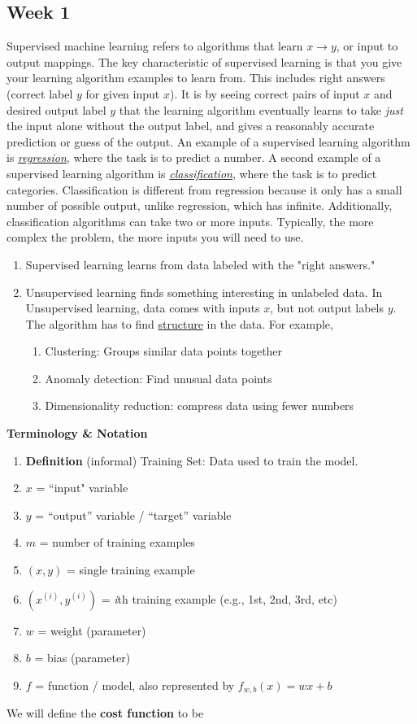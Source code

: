 \documentclass[11 pt]{scrartcl}
\begin{document}
\subsection{Week 1}
Supervised machine learning refers to algorithms that learn $x \rightarrow y$, or input to output mappings.
\newline\newline The key characteristic of supervised learning is that you give your learning algorithm examples to learn from. This includes
right answers (correct label $y$ for given input $x$). It is by seeing correct pairs of input $x$ and desired output label $y$
that the learning algorithm eventually learns to take \textit{just} the input alone without the output label, and gives a reasonably
accurate prediction or guess of the output. An example of a supervised learning algorithm is \textit{\underline{regression}}, where the task is to predict
a number. A second example of a supervised learning algorithm is \textit{\underline{classification}}, where the task is to predict
categories. Classification is different from regression because it only has a small number of possible output, unlike regression, which has infinite.
Additionally, classification algorithms can take two or more inputs. Typically, the more complex the problem, the more
inputs you will need to use. 
\begin{enumerate}
    \item Supervised learning learns from data labeled with the "right answers."
    \item Unsupervised learning finds something interesting in unlabeled data. In Unsupervised learning, 
    data comes with inputs $x$, but not output labels $y$. The algorithm has to find \underline{structure} in 
    the data. For example, 
    \begin{enumerate}
        \item Clustering: Groups similar data points together
        \item Anomaly detection: Find unusual data points
        \item Dimensionality reduction: compress data using fewer numbers
    \end{enumerate}
\end{enumerate}
\textbf{Terminology \& Notation}
\begin{enumerate}
    \item \textbf{Definition} (informal) Training Set: Data used to train the model.
    \item $x$ = ``input" variable
    \item $y$ = ``output'' variable / ``target'' variable
    \item $m$ = number of training examples
    \item $(x, y)$ = single training example
    \item $(x^{(i)}, y^{(i)})$ = \textit{i}th training example (e.g., 1st, 2nd, 3rd, etc)
    \item $w$ = weight (parameter)
    \item $b$ = bias (parameter)
    \item $f$ = function / model, also represented by $f_{w,b} (x) = wx + b$
\end{enumerate}
We will define the \textbf{cost function} to be
\end{document}
